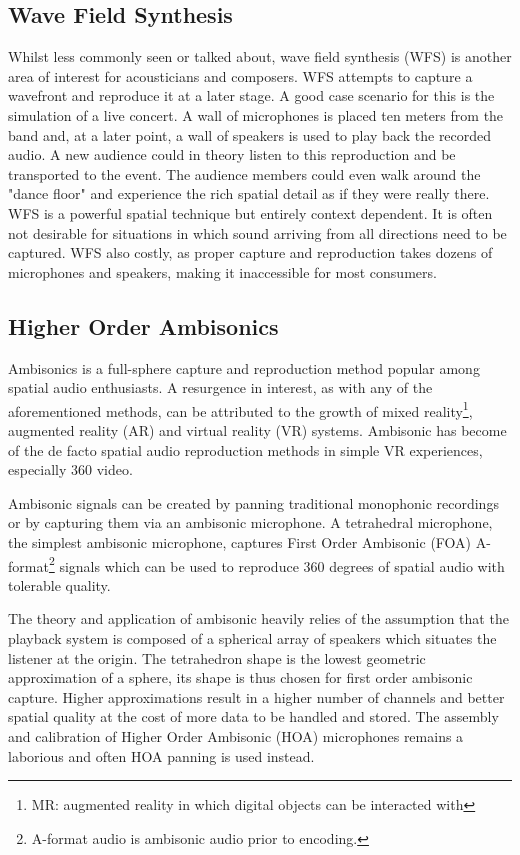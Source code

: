 \subsection{Wave Field Synthesis}
\label{subsec:wfs}

Whilst less commonly seen or talked about, wave field synthesis (WFS) is another area of interest for acousticians and composers. WFS attempts to capture a wavefront and reproduce it at a later stage. A good case scenario for this is the simulation of a live concert. A wall of microphones is placed ten meters from the band and, at a later point, a wall of speakers is used to play back the recorded audio. A new audience could in theory listen to this reproduction and be transported to the event. The audience members could even walk around the "dance floor" and experience the rich spatial detail as if they were really there. WFS is a powerful spatial technique but entirely context dependent. It is often not desirable for situations in which sound arriving from all directions need to be captured. WFS also costly, as proper capture and reproduction takes dozens of microphones and speakers, making it inaccessible for most consumers.

\subsection{Higher Order Ambisonics}
\label{subsec:ambi}

Ambisonics is a full-sphere capture and reproduction method popular among spatial audio enthusiasts. A resurgence in interest, as with any of the aforementioned methods, can be attributed to the growth of mixed reality\footnote{MR: augmented reality in which digital objects can be interacted with}, augmented reality (AR) and virtual reality (VR) systems. Ambisonic has become of the de facto spatial audio reproduction methods in simple VR experiences, especially 360 video. 

Ambisonic signals can be created by panning traditional monophonic recordings or by capturing them via an ambisonic microphone. A tetrahedral microphone, the simplest ambisonic microphone, captures First Order Ambisonic (FOA) A-format\footnote{A-format audio is ambisonic audio prior to encoding.} signals which can be used to reproduce 360 degrees of spatial audio with tolerable quality. 

The theory and application of ambisonic heavily relies of the assumption that the playback system is composed of a spherical array of speakers which situates the listener at the origin. The tetrahedron shape is the lowest geometric approximation of a sphere, its shape is thus chosen for first order ambisonic capture. Higher approximations result in a higher number of channels and better spatial quality at the cost of more data to be handled and stored. The assembly and calibration of Higher Order Ambisonic (HOA) microphones remains a laborious and often HOA panning is used instead.

